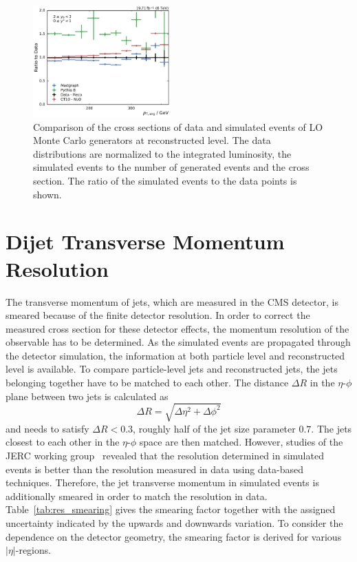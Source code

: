 \begin{figure}[htbp]
    \includegraphics[width=0.47\textwidth]{figures/measurement/ratio_reco_to_data_yb2ys0.pdf}
    \caption[Comparison of data with simulated events]{Comparison of the cross
        sections of data and simulated events of LO Monte Carlo generators at
        reconstructed level. The data distributions are normalized to the
        integrated luminosity, the simulated events to the number of generated
        events and the cross section. The ratio of the simulated events to the data
        points is shown.}
    \label{fig:ratio_recotodata}
\end{figure}


\section{Dijet Transverse Momentum  Resolution}
\label{sec:resolution}

The transverse momentum of jets, which are measured in the CMS detector, is
smeared because of the finite detector resolution. In order to correct the
measured cross section for these detector effects, the momentum resolution of
the observable has to be determined. As the simulated events are propagated
through the detector simulation, the information at both particle level and
reconstructed level is available. To compare particle-level jets and
reconstructed jets, the jets belonging together have to be matched to each
other. The distance $\Delta R$ in the $\eta$-$\phi$ plane between two jets is
calculated as
%
\begin{equation}
\Delta R = \sqrt{\Delta \eta^2 + \Delta \phi^2}
\end{equation}
%
and needs to satisfy $\Delta R < 0.3$, roughly half of the jet size parameter
$0.7$. The jets closest to each other in the $\eta$-$\phi$ space are then matched.
However, studies of the \textsc{JERC} working group~\cite{jetmet:resolution}
revealed that the resolution determined in simulated events is better than the
resolution measured in data using data-based techniques. Therefore, the jet
transverse momentum in simulated events is additionally smeared in order to
match the resolution in data.  Table~\ref{tab:res_smearing} gives the smearing
factor together with the assigned uncertainty indicated by the upwards and
downwards variation. To consider the dependence on the detector geometry, the
smearing factor is derived for various $|\eta|$-regions.

